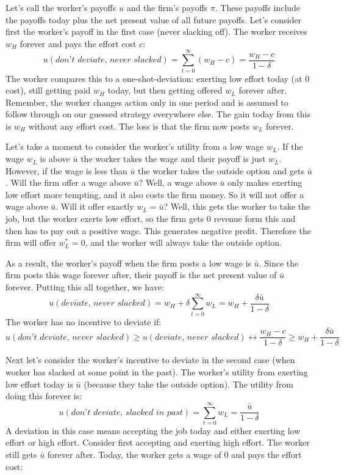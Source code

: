 \documentclass{article}
\begin{document}
Let's call the worker's payoffs $u$ and the firm's payoffs $\pi$. These payoffs include the payoffs today plus the net present value of all future payoffs. Let's consider first the worker's payoff in the first case (never slacking off). The worker receives $w_H$ forever and pays the effort cost $c$:
\[u(\textit{don't deviate, never slacked})=\sum_{t=0}^\infty (w_H-c)=\frac{w_H-c}{1-\delta}\]
The worker compares this to a one-shot-deviation: exerting low effort today (at 0 cost), still getting paid $w_H$ today, but then getting offered $w_L$ forever after. Remember, the worker changes action only in one period and is assumed to follow through on our guessed strategy everywhere else. The gain today from this is $w_H$ without any effort cost. The loss is that the firm now posts $w_L$ forever.

Let's take a moment to consider the worker's utility from a low wage $w_L$. If the wage $w_L$ is above $\bar u$ the worker takes the wage and their payoff is just $w_L$. However, if the wage is less than $\bar u$ the worker takes the outside option and gets $\bar u$. Will the firm offer a wage above $\bar u$? Well, a wage above $\bar u$ only makes exerting low effort more tempting, and it also costs the firm money. So it will not offer a wage above $\bar u$. Will it offer exactly $w_L=\bar u$? Well, this gets the worker to take the job, but the worker exerts low effort, so the firm gets $0$ revenue form this and then has to pay out a positive wage. This generates negative profit. Therefore the firm will offer $w_L^*=0$, and the worker will always take the outside option.

As a result, the worker's payoff when the firm posts a low wage is $\bar u$. Since the firm posts this wage forever after, their payoff is the net present value of $\bar u$ forever. Putting this all together, we have:
\[u(\textit{deviate, never slacked})=w_H+\delta \sum_{t=0}^\infty w_L = w_H+ \frac{\delta \bar u}{1-\delta}\]
The worker has no incentive to deviate if:
\[u(\textit{don't deviate, never slacked}) \geq u(\textit{deviate, never slacked}) \leftrightarrow \frac{w_H-c}{1-\delta}\geq w_H+ \frac{\delta \bar u}{1-\delta}\]

 Next let's consider the worker's incentive to deviate in the second case (when worker has slacked at some point in the past). The worker's utility from exerting low effort today is $\bar u$ (because they take the outside option). The utility from doing this forever is:
\[u(\textit{don't deviate, slacked in past})=\sum_{t=0}^\infty w_L=\frac{\bar u}{1-\delta}\]
 A deviation in this case means accepting the job today and either exerting low effort or high effort. Consider first accepting and exerting high effort. The worker still gets $\bar u$ forever after. Today, the worker gets a wage of 0 and pays the effort cost:
\end{document}
